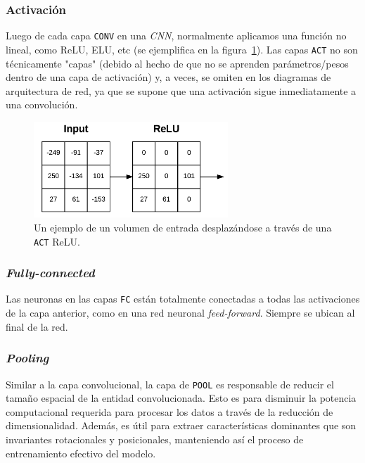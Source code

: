 \documentclass[a4paper,12pt]{article}
\begin{document}
\subsubsection{Activación}

Luego de cada capa \texttt{CONV} en una \textit{CNN}, normalmente aplicamos una función no lineal, como ReLU, ELU, etc (se ejemplifica en la figura~\ref{fig:relu-act}). Las capas \texttt{ACT} no son técnicamente "capas" (debido al hecho de que no se aprenden parámetros/pesos dentro de una capa de activación) y, a veces, se omiten en los diagramas de arquitectura de red, ya que se supone que una activación sigue inmediatamente a una convolución.

\begin{figure}[H]
	\begin{center}				
	\includegraphics[width=0.65\textwidth]{tesis_47.png}
  	\caption{Un ejemplo de un volumen de entrada desplazándose a través de una \texttt{ACT} ReLU.}
  	\label{fig:relu-act}
  	\end{center}
\end{figure}

\subsubsection{\textit{Fully-connected}}
Las neuronas en las capas \texttt{FC} están totalmente conectadas a todas las activaciones de la capa anterior, como en una red neuronal \textit{feed-forward}. Siempre se ubican al final de la red.

\subsubsection{\textit{Pooling}}

Similar a la capa convolucional, la capa de \texttt{POOL} es responsable de reducir el tamaño espacial de la entidad convolucionada. Esto es para disminuir la potencia computacional requerida para procesar los datos a través de la reducción de dimensionalidad. Además, es útil para extraer características dominantes que son invariantes rotacionales y posicionales, manteniendo así el proceso de entrenamiento efectivo del modelo.
\end{document}
